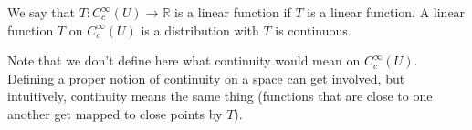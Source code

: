 \documentclass[book.tex]{subfiles}
\begin{document}
We say that $T: C^{\infty}_c(U) \to \mathbb{R}$ is a linear function if $T$ is a linear function. A linear function $T$ on $C^{\infty}_c(U)$ is a distribution with $T$ is continuous.

Note that we don't define here what continuity would mean on $C^{\infty}_c(U)$. Defining a proper notion of continuity on a space can get involved, but intuitively, continuity means the same thing (functions that are close to one another get mapped to close points by $T$).


\end{document}
